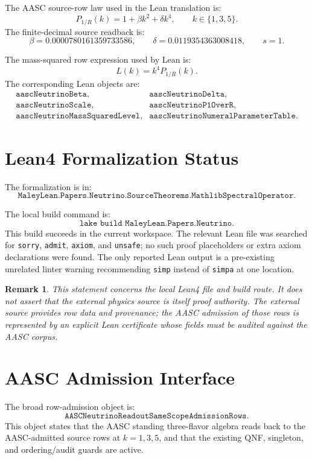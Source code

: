\documentclass[11pt]{article}
\newtheorem{remark}{Remark}
\begin{document}
The AASC source-row law used in the Lean translation is:
\[
  P_{1/R}(k) = 1 + \beta k^2 + \delta k^4,
  \qquad k \in \{1,3,5\}.
\]
The finite-decimal source readback is:
\[
  \beta = 0.0000780161359733586,
  \qquad
  \delta = 0.0119354363008418,
  \qquad
  s = 1.
\]

The mass-squared row expression used by Lean is:
\[
  L(k) = k^4 P_{1/R}(k).
\]
The corresponding Lean objects are:
\[
\begin{array}{ll}
\texttt{aascNeutrinoBeta},&
\texttt{aascNeutrinoDelta},\\
\texttt{aascNeutrinoScale},&
\texttt{aascNeutrinoP1OverR},\\
\texttt{aascNeutrinoMassSquaredLevel},&
\texttt{aascNeutrinoNumeralParameterTable}.
\end{array}
\]

\section{Lean4 Formalization Status}

The formalization is in:
\[
  \texttt{MaleyLean.Papers.Neutrino.SourceTheorems.MathlibSpectralOperator}.
\]

The local build command is:
\[
  \texttt{lake build MaleyLean.Papers.Neutrino}.
\]
This build succeeds in the current workspace.  The relevant Lean file was
searched for \texttt{sorry}, \texttt{admit}, \texttt{axiom}, and
\texttt{unsafe}; no such proof placeholders or extra axiom declarations were
found.  The only reported Lean output is a pre-existing unrelated linter
warning recommending \texttt{simp} instead of \texttt{simpa} at one location.

\begin{remark}
This statement concerns the local Lean4 file and build route.  It does not
assert that the external physics source is itself proof authority.  The
external source provides row data and provenance; the AASC admission of those
rows is represented by an explicit Lean certificate whose fields must be
audited against the AASC corpus.
\end{remark}

\section{AASC Admission Interface}

The broad row-admission object is:
\[
  \texttt{AASCNeutrinoReadoutSameScopeAdmissionRows}.
\]
This object states that the AASC standing three-flavor algebra reads back to
the AASC-admitted source rows at \(k=1,3,5\), and that the existing QNF,
singleton, and ordering/audit guards are active.
\end{document}
